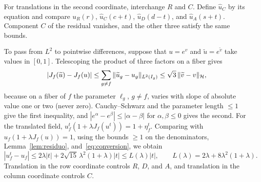 For translations in the second coordinate, interchange $R$ and $C$. Define $\widehat u_C$ by its equation and compare $u_R(r)$,
$\widehat u_C(c+t)$, $\widehat u_D(d-t)$, and $\widehat u_A(s+t)$. Component $C$ of the residual vanishes, and the other three satisfy
the same bounds.

To pass from $L^2$ to pointwise differences, suppose that $u=e^v$ and $\widetilde u=e^{\widetilde v}$ take values in $[0,1]$.
Telescoping the product of three factors on a fiber gives \begin{equation}\label{eq:conversion}
 |J_f(\widetilde u)-J_f(u)|\le\sum_{g\ne f}\|\widetilde u_g-u_g\|_{L^2(I_g)}\le\sqrt3\,\|\widetilde v-v\|_{\mathcal{H}} ,
\end{equation} because on a fiber of $f$ the parameter $\ell_g$, $g\ne f$, varies with slope of absolute value one or two (never zero).
Cauchy--Schwarz and the parameter length $\le1$ give the first inequality, and $|e^\alpha-e^\beta|\le|\alpha-\beta|$ for
$\alpha,\beta\le0$ gives the second. For the translated field, $u^t_f(1+\lambda J_f(u^t))=1+\eta^t_f$. Comparing with $u_f(1+\lambda
J_f(u))=1$, using the bounds $\ge1$ on the denominators, Lemma~\ref{lem:residuo}, and~\eqref{eq:conversion}, we obtain
\begin{equation}\label{eq:traslacion}
 |u^t_f-u_f|\le2\lambda|t|+2\sqrt{15}\,\lambda^2(1+\lambda)|t|\le L(\lambda)|t|,\qquad
 L(\lambda)=2\lambda+8\lambda^2(1+\lambda).
\end{equation} Translation in the row coordinate controls $R$, $D$, and $A$, and translation in the column coordinate controls $C$.
